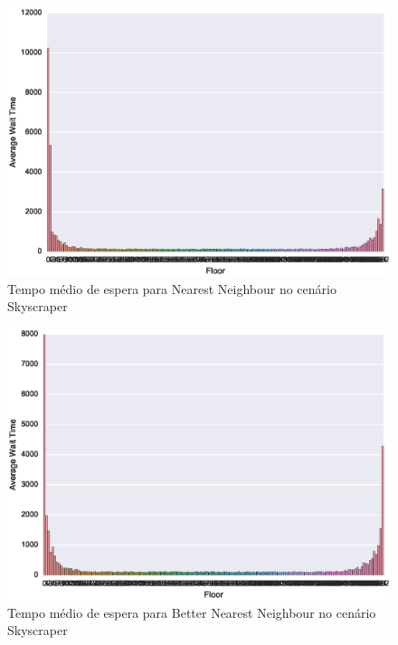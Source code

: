 \begin{figure}[htb!]
  \centering
  \includegraphics[scale=0.8]{img/results/Skyscraper/2_Simple_NearestNeighbour/averageWaitTime}
  \caption{Tempo médio de espera para Nearest Neighbour no cenário Skyscraper}
  \label{fig:result:skyscraper:avgwt:nn}
\end{figure}

\begin{figure}[htb!]
  \centering
  \includegraphics[scale=0.8]{img/results/Skyscraper/3_Simple_BetterNearestNeighbour/averageWaitTime}
  \caption{Tempo médio de espera para Better Nearest Neighbour no cenário Skyscraper}
  \label{fig:result:skyscraper:avgwt:bnn}
\end{figure}

